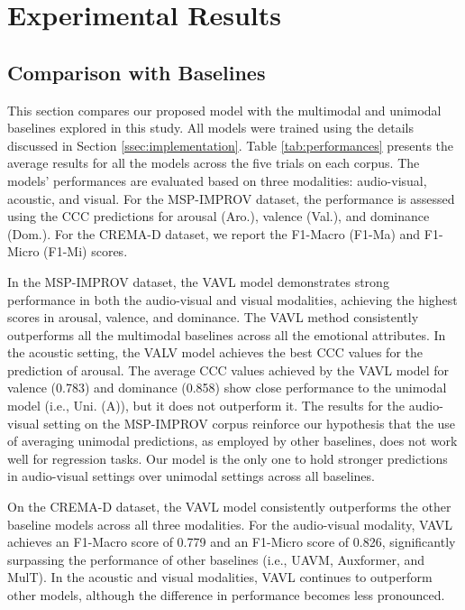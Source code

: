 \documentclass{article}
\begin{document}
\section{Experimental Results}
\label{ssec:experiments}

\subsection{Comparison with Baselines}

This section compares our proposed model with the multimodal and unimodal baselines explored in this study. All models were trained using the details discussed in Section \ref{ssec:implementation}. Table \ref{tab:performances} presents the average results for all the models across the five trials on each corpus. The models' performances are evaluated based on three modalities: audio-visual, acoustic, and visual. For the MSP-IMPROV dataset, the performance is assessed using the CCC predictions for arousal (Aro.), valence (Val.), and dominance (Dom.). For the CREMA-D dataset, we report the F1-Macro (F1-Ma) and F1-Micro (F1-Mi) scores.

In the MSP-IMPROV dataset, the VAVL model demonstrates strong performance in both the audio-visual and visual modalities, achieving the highest scores in arousal, valence, and dominance. The VAVL method consistently outperforms all the multimodal baselines across all the emotional attributes. In the acoustic setting, the VALV model achieves the best CCC values for the prediction of arousal. The average CCC values achieved by the VAVL model for valence (0.783) and dominance (0.858) show close performance to the unimodal model (i.e., Uni. (A)), but it does not outperform it. The results for the audio-visual setting on the MSP-IMPROV corpus reinforce our hypothesis that the use of averaging unimodal predictions, as employed by other baselines, does not work well for regression tasks. Our model is the only one to hold stronger predictions in audio-visual settings over unimodal settings across all baselines.

On the CREMA-D dataset, the VAVL model consistently outperforms the other baseline models across all three modalities. For the audio-visual modality, VAVL achieves an F1-Macro score of 0.779 and an F1-Micro score of 0.826, significantly surpassing the performance of other baselines (i.e., UAVM, Auxformer, and MulT). In the acoustic and visual modalities, VAVL continues to outperform other models, although the difference in performance becomes less pronounced.
\end{document}
